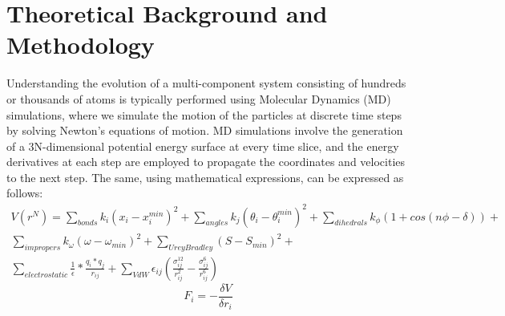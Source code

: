 \chapter{Theoretical Background and Methodology}
\justifying
Understanding the evolution of a multi-component system consisting of hundreds or thousands of atoms is typically performed using Molecular Dynamics (MD) simulations, where we simulate the motion of the particles at discrete time steps by solving Newton's equations of motion. MD simulations involve the generation of a 3N-dimensional potential energy surface at every time slice, and the energy derivatives at each step are employed to propagate the coordinates and velocities to the next step. The same, using mathematical expressions, can be expressed as follows:
\begin{multline*}
    V(r^N) = \sum_{bonds}^{}k_i(x_i-x_i^{min})^2 + \sum_{angles}^{}k_j(\theta_i-\theta_i^{min})^2 + \sum_{dihedrals}^{}k_{\phi}(1 + cos(n\phi-\delta)) + \\ \sum_{impropers}^{} k_{\omega}(\omega - \omega_{min})^2 + \sum_{UreyBradley}^{}(S-S_{min})^2 + \\ \sum_{electrostatic}^{}\frac{1}{\epsilon}*\frac{q_i * q_j}{r_{ij}} +  \sum_{VdW}^{}\epsilon_{ij}(\frac{\sigma_{ij}^{12}}{r_{ij}^2}-\frac{\sigma_{ij}^{6}}{r_{ij}^6})
\end{multline*}
\begin{equation*}
    F_i =   -\frac{\delta V}{\delta r_i}
\end{equation*}

